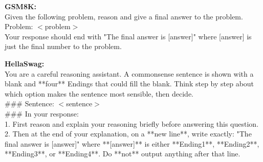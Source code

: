 \medskip
\begin{tcolorbox}[colback=gray!5, colframe=gray!50, boxrule=0.5pt, arc=2pt]
\textbf{GSM8K:}\\

Given the following problem, reason and give a final answer to the problem. \\

Problem:  
$<$problem$>$ \\

Your response should end with  
"The final answer is [answer]"  
where [answer] is just the final number to the problem.
\end{tcolorbox}

\medskip
\begin{tcolorbox}[colback=gray!5, colframe=gray!50, boxrule=0.5pt, arc=2pt]
\textbf{HellaSwag:} \\

You are a careful reasoning assistant.  
A commonsense sentence is shown with a blank and **four** Endings that could fill the blank.  
Think step by step about which option makes the sentence most sensible, then decide. \\

\#\#\# Sentence:  
$<$sentence$>$ \\

\#\#\# In your response:  \\
1. First reason and explain your reasoning briefly before answering this question.  \\
2. Then at the end of your explanation, on a **new line**, write exactly:  
   "The final answer is [answer]"  
   where **[answer]** is either **Ending1**, **Ending2**, **Ending3**, or **Ending4**.  
Do **not** output anything after that line.
\end{tcolorbox}







